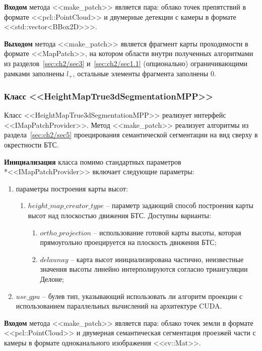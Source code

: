 \textbf{Входом} метода <<make\_patch>> является пара: облако точек препятствий в формате <<pcl::PointCloud>> и двумерные детекции с камеры в формате <<std::vector<BBox2D>>>.

\textbf{Выходом} метода <<make\_patch>> является фрагмент карты проходимости в формате <<MapPatch>>, на котором области внутри полученных алгоритмами из разделов~\cref{sec:ch2/sec3} и~\cref{sec:ch2/sec1.1} (опционально) ограничивающими рамками заполнены $l_+$, остальные элементы фрагмента заполнены $0$.

\subsubsection{Класс <<HeightMapTrue3dSegmentationMPP>>}

Класс <<HeightMapTrue3dSegmentationMPP>> реализует интерфейс <<IMapPatchProvider>>. Метод <<make\_patch>> реализует алгоритмы из раздела~\cref{sec:ch2/sec5} проецирования семантической сегментации на вид сверху в окрестности БТС.

\textbf{Инициализация} класса помимо стандартных параметров\\*<<IMapPatchProvider>> включает следующие параметры:

\begin{enumerate}
	\item параметры построения карты высот:
	\begin{enumerate}
	\item $height\_map\_creator\_type$ -- параметр задающий способ построения карты высот над плоскостью движения БТС. Доступны варианты:
	\begin{enumerate}
	\item $ortho\_projection$ -- использование готовой карты высоты, которая прямоугольно проецируется на плоскость движения БТС;
	\item $delaunay$ -- карта высот инициализирована частично, неизвестные значения высоты линейно интерполируются согласно триангуляции Делоне;
    \end{enumerate}
    \end{enumerate}
	\item $use\_gpu$ -- булев тип, указывающий использовать ли алгоритм проекции с использованием параллельных вычислений на архитектуре CUDA.
\end{enumerate}

\textbf{Входом} метода <<make\_patch>> является пара: облако точек земли в формате <<pcl::PointCloud>> и двумерная семантическая сегментация проезжей части с камеры в формате одноканального изображения <<cv::Mat>>.

